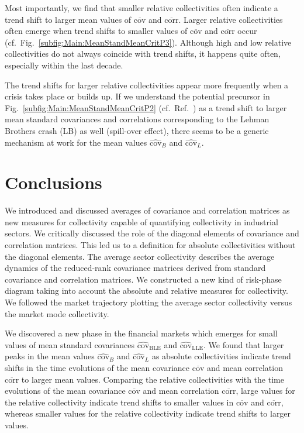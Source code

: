 \documentclass[aps, pra, groupedaddress, showkeys, twocolumn, floatfix, 10pt]{revtex4-2}
\newcommand*\mean[1]{\overline{#1}}
\newcommand*\meanNONDiag[1]{\widehat{#1}}
\begin{document}
Most importantly, we find that
smaller relative collectivities often indicate a trend shift to larger mean values of $\mean{\text{cov}}$ and $\mean{\text{corr}}$. 
Larger relative collectivities often emerge when trend shifts to smaller values of $\mean{\text{cov}}$ and $\mean{\text{corr}}$ occur (cf.~Fig.~\ref{subfig:Main:MeanStandMeanCritP3}).
Although high and low relative collectivities do not always coincide with trend shifts, it happens quite often, especially within the last decade.

The trend shifts for larger relative collectivities appear more frequently when a crisis takes place or builds up.
If we understand the potential precursor in Fig.~\ref{subfig:Main:MeanStandMeanCritP2} (cf.~Ref.~\cite{Heckens_2022}) as a trend shift to larger mean standard covariances and correlations corresponding to the Lehman Brothers crash (LB) as well (spill-over effect), there seems to be a generic mechanism at work for the mean values $\meanNONDiag{\text{cov}}_{{B}}$ and $\meanNONDiag{\text{cov}}_{{L}}$.



\section{\label{sec:Conclusion}Conclusions}


We introduced and discussed averages of covariance and correlation matrices as new measures for collectivity capable of quantifying collectivity in industrial sectors.
We critically discussed the role of the diagonal elements of covariance and correlation matrices. This led us
to a definition for absolute collectivities without the diagonal elements.
The average sector collectivity describes the average dynamics of the reduced-rank covariance matrices derived from standard covariance and correlation matrices.
We constructed a new kind of risk-phase diagram taking into account the absolute and relative measures for collectivity.
We followed the market trajectory plotting the average sector collectivity versus the market mode collectivity.

We discovered a new phase in the financial markets which emerges for small values of mean standard covariances
$\meanNONDiag{\text{cov}}_{\text{BLE}}$ and $\meanNONDiag{\text{cov}}_{\text{LLE}}$.
We found that larger peaks in the mean values $\meanNONDiag{\text{cov}}_{{B}}$ and $\meanNONDiag{\text{cov}}_{{L}}$ as absolute collectivities indicate trend shifts in the time evolutions of the mean covariance $\mean{\text{cov}}$ and mean correlation $\mean{\text{corr}}$ to larger mean values.
Comparing the relative collectivities with the time evolutions of the mean covariance $\mean{\text{cov}}$ and mean correlation $\mean{\text{corr}}$,
large values for the relative collectivity indicate trend shifts to smaller values in $\mean{\text{cov}}$
and $\mean{\text{corr}}$, 
whereas smaller values for the relative collectivity indicate trend shifts to larger values.
\end{document}
